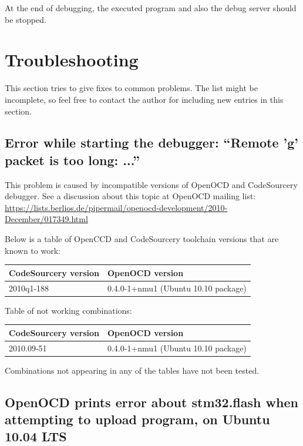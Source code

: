 \documentclass[a4paper, 10pt]{article}
\begin{document}
At the end of debugging, the executed program and also the
debug server should be stopped.

\section{Troubleshooting}

This section tries to give fixes to common problems.
The list might be incomplete, so feel free to contact the author for including
new entries in this section.

\subsection{Error while starting the debugger: ``Remote 'g' packet is too long: ...''}

\label{sect:gdb-problems}
This problem is caused by incompatible versions of OpenOCD and CodeSourcery debugger.
See a discussion about this topic at OpenOCD mailing list:
\url{https://lists.berlios.de/pipermail/openocd-development/2010-December/017349.html}

Below is a table of OpenCCD and CodeSourcery toolchain versions that are known to work:

    \smallskip
    \begin{tabular}{ l | l }
    CodeSourcery version & OpenOCD version \\
    \hline
    2010q1-188          &   0.4.0-1+nmu1 (Ubuntu 10.10 package) \\
    \end{tabular}
    \smallskip

Table of not working combinations:

    \smallskip
    \begin{tabular}{ l | l }
    CodeSourcery version & OpenOCD version \\
    \hline
    2010.09-51          &   0.4.0-1+nmu1 (Ubuntu 10.10 package) \\
    \end{tabular}
    \smallskip

Combinations not appearing in any of the tables have not been tested.

\subsection{OpenOCD prints error about stm32.flash
    when attempting to upload program,
    on Ubuntu 10.04 LTS}
\end{document}
